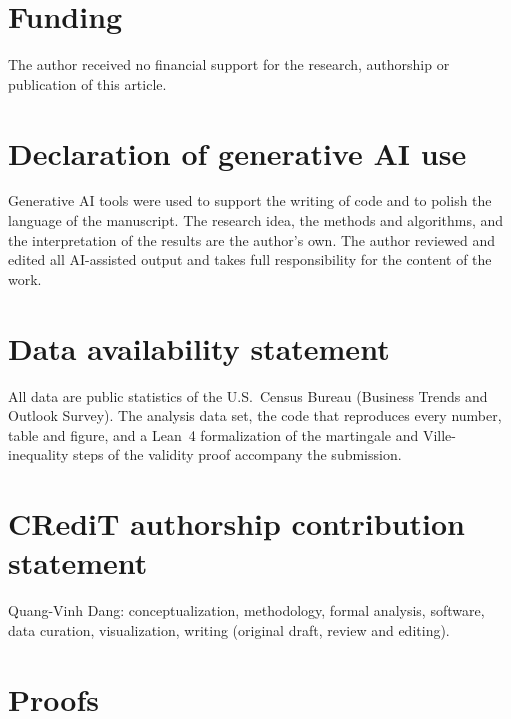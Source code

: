 \documentclass[11pt]{article}
\theoremstyle{plain}
\theoremstyle{definition}
\begin{document}
\section*{Funding}
The author received no financial support for the research, authorship or publication of this article.

\section*{Declaration of generative AI use}
Generative AI tools were used to support the writing of code and to polish the language of the manuscript. The research idea, the methods and algorithms, and the interpretation of the results are the author's own. The author reviewed and edited all AI-assisted output and takes full responsibility for the content of the work.

\section*{Data availability statement}
All data are public statistics of the U.S.\ Census Bureau (Business Trends and Outlook Survey). The analysis data set, the code that reproduces every number, table and figure, and a Lean~4 formalization of the martingale and Ville-inequality steps of the validity proof accompany the submission.

\section*{CRediT authorship contribution statement}
Quang-Vinh Dang: conceptualization, methodology, formal analysis, software, data curation, visualization, writing (original draft, review and editing).




\appendix
\section{Proofs}
\label{app:proof}
\end{document}
